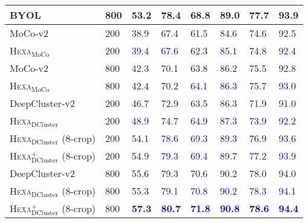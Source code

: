 \documentclass[10pt,twocolumn,letterpaper]{article}
\newcommand{\shortname}{\textsc{Hexa}}
\begin{document}
\begin{table}[t!]
\begin{tabular}{@{}lp{18pt}|p{18pt}@{}p{18pt}@{}|p{18pt}@{}p{18pt}|p{18pt}@{}p{18pt}}
BYOL~\cite{grill2020bootstrap} & 800 & 53.2 & 78.4 & 68.8 & 89.0 & 77.7 & 93.9\\
\hline
 MoCo-v2~\cite{chen2020improved} &  200  & 38.9  & 67.4  &  61.5 & 84.6
 & 74.6  & 92.5 \\
\rowcolor{Gray}
\cellcolor{white}
   \shortname{}$_{\text{MoCo}}$  &  200   & \textcolor{blue}{39.4}   & \textcolor{blue}{67.6}   &  \textcolor{blue}{62.3}   & \textcolor{blue}{85.1}  & 
   \textcolor{blue}{74.8}   & \textcolor{blue}{92.4} 
  \\ \hline 
 MoCo-v2~\cite{chen2020improved} &  800  & 42.3 &  70.1  & 63.8 &  86.2 & 75.5 & 92.8\\
\rowcolor{Gray}
\cellcolor{white}
   \shortname{}$_{\text{MoCo}}$  &  800   & \textcolor{blue}{42.4}  & \textcolor{blue}{70.2}  &  \textcolor{blue}{64.1} & \textcolor{blue}{86.3} & 
    \textcolor{blue}{75.7} & \textcolor{blue}{93.0}
  \\ \hline
 DeepCluster-v2~\cite{caron2018deepcluster,caron2020unsupervised} &  200  & 46.7 & 72.9  & 63.5 & 86.3 & 71.9 &  91.0\\
\rowcolor{Gray}
\cellcolor{white}
   \shortname{}$_{\text{DCluster}}$  &  200   & \textcolor{blue}{48.9}  & \textcolor{blue}{74.7}   & \textcolor{blue}{64.9} & \textcolor{blue}{87.3} & 
   \textcolor{blue}{ 73.9} & \textcolor{blue}{92.2} 
  \\  
\rowcolor{Gray}
\cellcolor{white}
   \shortname{}$_{\text{DCluster}}$ (8-crop)  &  200   & \textcolor{blue}{54.1}  &  \textcolor{blue}{78.6} & \textcolor{blue}{69.3}  &  \textcolor{blue}{89.3} & 
\textcolor{blue}{76.9}  &  \textcolor{blue}{93.6}    
  \\    
\rowcolor{Gray}
\cellcolor{white}
  \shortname{}$_{\text{DCluster}}^{+}$ (8-crop)  &  200 &   \textcolor{blue}{54.9} & \textcolor{blue}{79.3} & \textcolor{blue}{69.4} & \textcolor{blue}{89.7} &
  \textcolor{blue}{77.2}  &  \textcolor{blue}{93.9} 
  \\ \hline
 DeepCluster-v2~\cite{caron2018deepcluster,caron2020unsupervised} &  800  & 55.6 & 79.3  & 70.6 & 90.2 & 78.0 & 94.0 
  \\  
\rowcolor{Gray}
\cellcolor{white}
   \shortname{}$_{\text{DCluster}}$ (8-crop)  &  800   & 55.3  & 79.1 & \textcolor{blue}{70.8}  &  \textcolor{blue}{90.2} & 
\textcolor{blue}{78.3}  &  \textcolor{blue}{94.1}    
\\
\rowcolor{Gray}
\cellcolor{white}
  \shortname{}$_{\text{DCluster}}^{+}$ (8-crop)  &  800 &   \textcolor{blue}{\textbf{57.3}} & \textcolor{blue}{\textbf{80.7}} & \textcolor{blue}{\textbf{71.8}} & \textcolor{blue}{\textbf{90.8}} & 
  \textcolor{blue}{\textbf{78.6}} & \textcolor{blue}{\textbf{94.4}} \\ 
  



\end{tabular}
\end{table}
\end{document}
